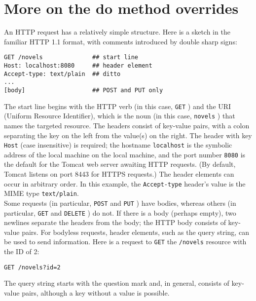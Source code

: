 \documentclass[12pt]{article}
\begin{document}
\section{More on the do method overrides}

An HTTP request has a relatively simple structure. Here is a sketch in the familiar HTTP 1.1 format, with comments introduced by double sharp signs:\\

\begin{lstlisting}
GET /novels              ## start line
Host: localhost:8080     ## header element
Accept-type: text/plain  ## ditto
...
[body]                   ## POST and PUT only

\end{lstlisting}

The start line begins with the HTTP verb (in this case, \verb|GET| ) and the URI (Uniform Resource Identifier), which is the noun (in this case, \verb|novels| ) that names the targeted resource. The headers consist of key-value pairs, with a colon separating the key on the left from the value(s) on the right. The header with key \verb|Host| (case insensitive) is required; the hostname \verb|localhost| is the symbolic address of the local machine on the local machine, and the port number \verb|8080| is the default for the Tomcat web server awaiting HTTP requests. (By default, Tomcat listens on port 8443 for HTTPS requests.) The header elements can occur in arbitrary order. In this example, the \verb|Accept-type| header's value is the MIME type \verb|text/plain|.\\

Some requests (in particular, \verb|POST| and \verb|PUT| ) have bodies, whereas others (in particular, \verb|GET| and \verb|DELETE| ) do not. If there is a body (perhaps empty), two newlines separate the headers from the body; the HTTP body consists of key-value pairs. For bodyless requests, header elements, such as the query string, can be used to send information. Here is a request to \verb|GET| the \verb|/novels| resource with the ID of 2:\\

\begin{lstlisting}
GET /novels?id=2

\end{lstlisting}

The query string starts with the question mark and, in general, consists of key-value pairs, although a key without a value is possible.\\
\end{document}
